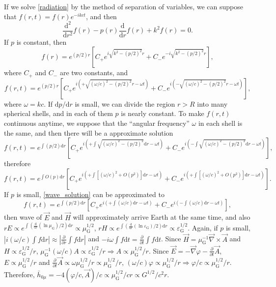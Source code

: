 \documentclass{article}
\def\d{\mathrm{d}}
\def\p{\partial}
\begin{document}
If we solve \eqref{radiation} by the method of separation of variables, we can suppose that $f(r,t)=f(r)e^{-ikct}$, and then
\begin{equation}\label{radiation_r}
    \frac{\d^2}{\d r^2}f(r)-p(r)\frac{\d}{\d r}f(r)+k^2f(r)=0.
\end{equation}
If $p$ is constant, then
\begin{equation}
    f(r)=e^{(p/2)r}[C_+e^{i\sqrt{k^2-(p/2)^2}r}+C_-e^{-i\sqrt{k^2-(p/2)^2}r}],
\end{equation}
where $C_+$ and $C_-$ are two constants, and
\begin{equation}
    f(r,t)=e^{(p/2)r}[C_+e^{i(+\sqrt{(\omega/c)^2-(p/2)^2}r-\omega t)}+C_-e^{i(-\sqrt{(\omega/c)^2-(p/2)^2}r-\omega t)}],
\end{equation}
where $\omega=kc$. If $\d p/\d r$ is small, we can divide the region $r> R$ into many spherical shells, and in each of them $p$ is nearly constant. To make $f(r,t)$ continuous anytime, we suppose that the ``angular frequency'' $\omega$ in each shell is the same, and then there will be a approximate solution
\begin{equation}\label{wave_solution}
    f(r,t)=e^{\int(p/2)\d r}[C_+e^{i(+\int\sqrt{(\omega/c)^2-(p/2)^2}\d r-\omega t)}+C_-e^{i(-\int\sqrt{(\omega/c)^2-(p/2)^2}\d r-\omega t)}],
\end{equation}
therefore
\begin{equation}
    f(r,t)=e^{\int O(p)\d r}[C_+e^{i(+\int[(\omega/c)^2+O(p^2)]\d r-\omega t)}+C_-e^{i(+\int[(\omega/c)^2+O(p^2)]\d r-\omega t)}].
\end{equation}
If $p$ is small, \eqref{wave_solution} can be approximated to
\begin{equation}
    f(r,t)=e^{\int(p/2)\d r}[C_+e^{i(+\int(\omega/c)\d r-\omega t)}+C_-e^{i(-\int(\omega/c)\d r-\omega t)}],
\end{equation}
then wave of $\vec{E}$ and $\vec{H}$ will approximately arrive Earth at the same time, and also $rE \propto e^{\int(\frac{\d}{\d r}(\ln\mu_{\text{G}})/2)\d r} \propto \mu_{\text{G}}^{1/2}$, $rH\propto e^{\int(\frac{\d}{\d r}(\ln\varepsilon_{\text{G}})/2)\d r} \propto \varepsilon_{\text{G}}^{1/2}$. Again, if $p$ is small, $\left\lvert i(\omega/c)\int f\d r\right\rvert \approx\left\lvert \frac{\p}{\p r}\int f\d r\right\rvert $ and $-i\omega\int f\d t=\frac{\p}{\p t}\int f\d t$. Since $\vec{H}=\mu_\text{G}^{-1}\vec{\nabla}\times\vec{A}$ and $H\propto \varepsilon_\text{G}^{1/2}/r$, $\mu_\text{G}^{-1}(\omega/c)A\propto\varepsilon_{\text{G}}^{1/2}/r\Rightarrow A\propto \mu_\text{G}^{1/2}/r$. Since $\vec{E}=-\vec{\nabla}\varphi-\frac{\p}{\p t}\vec{A}$, $E\propto \mu_\text{G}^{1/2}/r$ and $\frac{\p}{\p t}\vec{A}\propto \omega\mu_\text{G}^{1/2}/r\propto \mu_\text{G}^{1/2}/r$, $(\omega/c)\varphi\propto\mu_\text{G}^{1/2}/r\Rightarrow \varphi/c\propto\mu_\text{G}^{1/2}/r$. Therefore, $\bar{h}_{0 \mu}=-4(\varphi/c,\vec{A})/c\propto\mu_\text{G}^{1/2}/cr\propto G^{1/2}/c^2r$.
\end{document}
